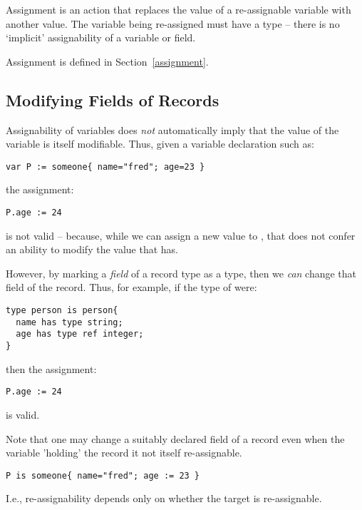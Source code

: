 Assignment is an action that replaces the value of a re-assignable variable with another value. The variable being re-assigned must have a  type -- there is no `implicit' assignability of a variable or field.

Assignment is defined in Section~\vref{assignment}.

\subsection{Modifying Fields of Records}
\label{fieldModify}
Assignability of variables does \emph{not} automatically imply that the value of the variable is itself modifiable. Thus, given a variable declaration such as:
\begin{lstlisting}
var P := someone{ name="fred"; age=23 }
\end{lstlisting}
the assignment:
\begin{lstlisting}
P.age := 24
\end{lstlisting}
is not valid -- because, while we can assign a new value to , that does not confer an ability to modify the value that  has.

However, by marking a \emph{field} of a record type as a  type, then we \emph{can} change that field of the record. Thus, for example, if the type of  were:
\begin{lstlisting}
type person is person{
  name has type string;
  age has type ref integer;
}
\end{lstlisting}
then the assignment:
\begin{lstlisting}
P.age := 24
\end{lstlisting}
is valid.
\begin{aside}
Note that one may change a suitably declared field of a record even when the variable 'holding' the record it not itself re-assignable.
\begin{lstlisting}
P is someone{ name="fred"; age := 23 }
\end{lstlisting}
I.e., re-assignability depends only on whether the target is re-assignable.
\end{aside}



